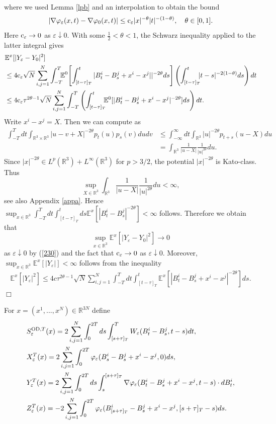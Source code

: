 \documentclass[11pt]{article}
\newcommand{\Ebb}{{\mathbb E}}
\providecommand{\eq}[1]{\begin{equation}\label{#1}}
\providecommand{\en}{\end{equation}}
\providecommand{\qed}{\hfill {$\Box$}\par\medskip}
\providecommand{\BR}{{\mathbb{R}^3 }}
\providecommand{\iijj}{\sum_{i,j=1}^N}
\providecommand{\od}{{\rm OD}}
\providecommand{\RR}{\mathbb{R}}
\providecommand{\kak}[1]{(\ref{#1})}
\providecommand{\lk}{\left(}
\providecommand{\rk}{\right)}
\providecommand{\non}{\nonumber}
\providecommand{\1}{\mathbb{1}}
\providecommand{\eps}{\varepsilon}
\providecommand{\ce}{{\rm c}_\eps}
\begin{document}
where we used  Lemma \ref{lpb} and an interpolation to obtain the bound
\eq{interp}
|\nabla \varphi_\eps(x,t)-\nabla \varphi_0(x,t)| \le \ce    |x|^{-\theta} |t|^{-(1-\theta)},
\quad \theta \in [0,1].
\en
Here $\ce  \to 0$ as $\eps\downarrow 0$. With some $\frac{1}{2}<\theta <1$, the Schwarz inequality applied
to the latter integral gives
\begin{align}
&\Ebb^x[|Y_\eps-Y_0|^2] \non \\
&
\leq
4\ce  \sqrt N \iijj \int_{-T}^T\!\!\!
 \Ebb^0\!\left[\int_{[t-\tau]_T}^t |B_t^i-B_s^j+x^i-x^j||^{-2\theta} ds \right]
\lk \int_{[t-\tau]_T}^t \!\!\! |t-s|^{-2(1-\theta)} ds \rk  dt \non \\
&
\label{230}
\leq
4 \ce   \tau^{2\theta-1}\sqrt N \iijj \int_{-T}^T \lk
\int_{[t-\tau]_T}^t \!\!\! \Ebb^0 [|B_t^i-B_s^j+x^i-x^j|^{-2\theta}] ds\rk  dt.
\end{align}
Write $x^i-x^j=X$. Then we can compute as
\begin{align*}
\int_{-T}^ T dt \int_{\BR\times\BR} \!\!\! |u-v+X|^{-2\theta}p_t(u)p_s(v) du dv
&\leq
\int_{-\infty}^ \infty dt \int_{\BR} |u|^{-2\theta}p_{t+s}(u-X) du \\
&=
\int_{\BR} \frac{1}{|u-X|} \frac{1}{|u|^{2\theta}}du.
\end{align*}
Since  $|x|^{-2\theta}\in L^p(\BR)+L^\infty(\BR)$ for $p > 3/2$, the potential $|x|^{-2\theta}$
is Kato-class. Thus
$$
\sup_{X\in\BR} \int_{\BR} \frac{1}{|u-X|} \frac{1}{|u|^{2\theta}}du <\infty,
$$
see also Appendix \ref{appa}. Hence $\sup_{x\in\BR} \int_{-T}^T dt \int_{[t-\tau]_T}^t ds
\Ebb^x[|B_t^i-B_s^j|^{-2\theta}] <\infty$ follows. Therefore we obtain that
\eq{231}
\sup_{x\in\BR}\Ebb^x [|Y_\eps-Y_0|^2] \to 0
\en
as $\eps\downarrow 0$ by \kak{230} and the fact that $\ce  \to 0$ as $\eps\downarrow 0$.
Moreover, $\sup_{x\in\BR} \Ebb^x [|Y_\eps|]<\infty$ follows from the inequality
\begin{align*}
\Ebb^x[|Y_\eps|^2]
\le
4c \tau^{2\theta-1}   \sqrt N\iijj \int_{-T}^T dt
\int_{[t-\tau]_T}^t \Ebb^x [|B_t^i-B_s^j+x^i-x^j|^{-2\theta}] ds.
\end{align*}
\qed
For $x=(x^1,...,x^N)\in \RR^{3N}$ define
\begin{align*}
&S_\eps^{\od, T}(x)=2\sum_{i,j=1}^N \int_0^{2T} ds\int_{[s+\tau]_T}^T W_\eps(B_t^i-B_s^j,t-s) dt,\\
&X_\eps^T(x)=2\iijj \int_0^{2T}\varphi_\eps(B_s^i-B_s^j+x^i-x^j,0) ds,\\
&Y_\eps^T(x)=2\sum_{i,j=1}^N  \int_0^{2T} ds \int_s^{[s+\tau]_T}\nabla\varphi_\eps(B_t^i-B_s^j+x^i-x^j, t-s) \cdot dB_t^i,\\
&Z_\eps^T(x)=-2\sum_{i,j=1}^N \int_0^{2T}\varphi_\eps(B_{[s+\tau]_T}^i-B_s^j+x^i-x^j, [s+\tau]_T-s)ds.
\end{align*}
\end{document}
